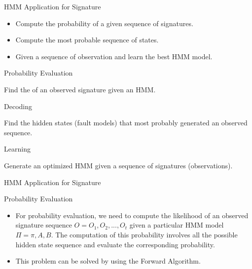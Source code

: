 \documentclass[aspectratio=1610]{beamer}
\begin{document}
\begin{frame}{HMM Application for Signature}

\begin{itemize}
\item Compute the probability of a given sequence of signatures.
\item Compute the most probable sequence of states.
\item Given a sequence of observation and learn the best HMM model.

\end{itemize}

\begin{block}{Probability Evaluation}
\end{block}
Find the of an observed signature given an HMM.




\begin{block}{Decoding}
\end{block}
Find the hidden states (fault models) that most probably generated an observed sequence.



\begin{block}{Learning}

\end{block}
Generate an optimized HMM given a sequence of signatures (observations).



\end{frame}






\begin{frame}{HMM Application for Signature}

\begin{block}{Probability Evaluation}
\end{block}
\begin{itemize}


\item For probability evaluation, we need to compute the likelihood of an observed signature sequence $O = {O_1, O_2,...,O_t}$ given a particular HMM model $ \Pi = {\pi, A, B}$. The computation of this probability involves all the possible hidden state sequence and evaluate the corresponding probability. 


\item This problem can be solved by using the Forward Algorithm.
\end{itemize}

\end{frame}
\end{document}

